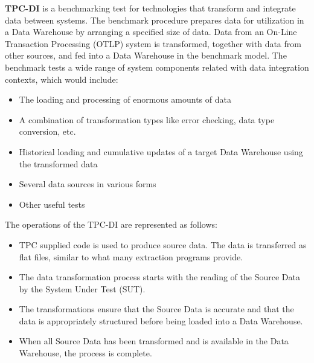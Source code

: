 \documentclass{article}
\newcommand\bld[1]{\textbf{#1}}
\begin{document}
\bld{TPC-DI} is a benchmarking test for technologies that transform and integrate data between systems. The benchmark procedure prepares data for utilization in a Data Warehouse by arranging a specified size of data. Data from an On-Line Transaction Processing (OTLP) system is transformed, together with data from other sources, and fed into a Data Warehouse in the benchmark model. The benchmark tests a wide range of system components related with data integration contexts, which would include:
\begin{itemize}
    \item The loading and processing of enormous amounts of data
    \item A combination of transformation types like error checking, data type conversion, etc.
    \item Historical loading and cumulative updates of a target Data Warehouse using the transformed data
    \item Several data sources in various forms 
    \item Other useful tests
\end{itemize}
The operations of the TPC-DI are represented as follows:
\begin{itemize}
    \item TPC supplied code is used to produce source data. The data is transferred as flat files, similar to what many extraction programs provide.
    \item The data transformation process starts with the reading of the Source Data by the System Under Test (SUT).
    \item The transformations ensure that the Source Data is accurate and that the data is appropriately structured before being loaded into a Data Warehouse.
    \item When all Source Data has been transformed and is available in the Data Warehouse, the process is complete.
\end{itemize}
\end{document}
